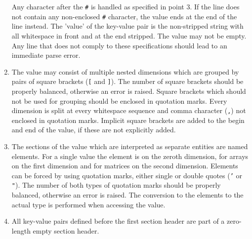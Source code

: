 \begin{enumerate}
Any character after the \texttt{\#} is handled as specified in point 3.
If the line does not contain any non-enclosed \texttt{\#} character, the value ends at the end of the line instead.
The 'value' of the key-value pair is the non-stripped string with all whitespace in front and at the end stripped. 
The value may not be empty.
Any line that does not comply to these specifications should lead to an immediate parse error.
\item The value may consist of multiple nested dimensions which are grouped by pairs of square brackets (\texttt{[} and \texttt{]}).
The number of square brackets should be properly balanced, otherwise an error is raised.
Square brackets which should not be used for grouping should be enclosed in quotation marks.
Every dimension is split at every whitespace sequence and comma character (\texttt{,}) not enclosed in quotation marks.
Implicit square brackets are added to the begin and end of the value, if these are not explicitly added.
\item The sections of the value which are interpreted as separate entities are named elements. 
For a single value the element is on the zeroth dimension, for arrays on the first dimension and for matrices on the second dimension.
Elements can be forced by using quotation marks, either single or double quotes (\texttt{'} or \texttt{"}). 
The number of both types of quotation marks should be properly balanced, otherwise an error is raised.
The conversion to the elements to the actual type is performed when accessing the value.
\item All key-value pairs defined before the first section header are part of a zero-length empty section header.
\end{enumerate}

